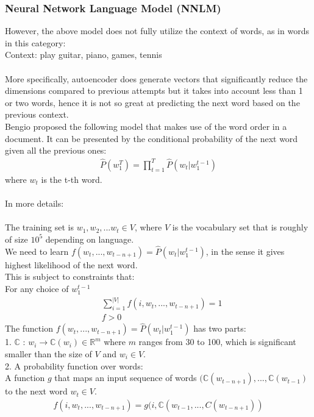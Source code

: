 \documentclass[paper=a4, fontsize=12pt]{scrartcl}
\begin{document}
\subsubsection{Neural Network Language Model (NNLM)}
However, the above model does not fully utilize the context of words, as in words in this category:\\
Context: play {guitar, piano, games, tennis}\\\\
More specifically, autoencoder does generate vectors that significantly reduce the dimensions compared to previous attempts but it takes into account less than 1 or two words, hence it is not so great at predicting the next word based on the previous context. \\
Bengio proposed the following model that makes use of the word order in a document. It can be presented by the conditional probability of the next word given all the previous ones:
\begin{align*}
\hat{P} (w^{T}_1) = \prod^T_{t=1} \hat{P} (w_t | w^{t-1}_1)
\end{align*}
where $w_t$ is the t-th word.\\\\
In more details: \\\\
The training set is $w_1, w_2, ... w_t \in V$, where $V$ is the vocabulary set that is roughly of size $10^5$ depending on language. \\
We need to learn $f(w_t, ..., w_{t-n+1})= \hat{P} (w_t | w^{t-1}_1)$, in the sense it gives highest likelihood of the next word.\\
This is subject to constraints that: \\
For any choice of $w^{t-1}_1$
\begin{align*}
& \sum_{i=1}^{\lvert V \rvert} f(i, w_t, ..., w_{t-n+1}) = 1 \\
& f > 0
\end{align*}
The function $f(w_t, ..., w_{t-n+1})= \hat{P} (w_t | w^{t-1}_1)$ has two parts: \\
 1. $\mathbb{C}$ : $w_i \rightarrow \mathbb{C}(w_i) \in \mathbb{R}^m$ where $m$ ranges from 30 to 100, which is significant smaller than the size of $V$ and $w_i \in V$.\\
 2. A probability function over words: \\
 A function $g$ that maps an input sequence of words $(\mathbb{C}(w_{t-n+1}), ..., \mathbb{C}(w_{t-1})$ to the next word $w_t \in V$.
 \begin{align*}
 f(i, w_t, ..., w_{t-n+1}) = g(i, \mathbb{C}(w_{t-1}, ...,  C(w_{t-n+1}))
 \end{align*}
\end{document}
